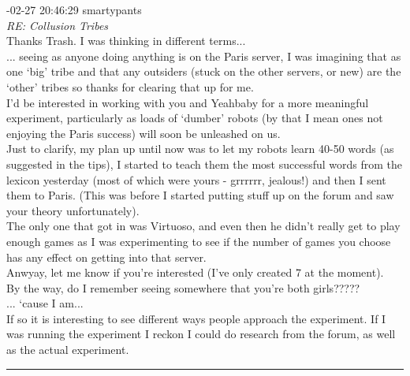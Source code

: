 \begin{mail}
{-02-27 20:46:29 smartypants}\\
{\itshape RE: Collusion Tribes}\\
Thanks Trash. I was thinking in different terms...\\
... seeing as anyone doing anything is on the Paris server, I was imagining that as one `big' tribe and that any outsiders (stuck on the other servers, or new) are the `other' tribes so thanks for clearing that up for me.\\
I'd be interested in working with you and Yeahbaby for a more meaningful experiment, particularly as loads of `dumber' robots (by that I mean ones not enjoying the Paris success) will soon be unleashed on us.\\
Just to clarify, my plan up until now was to let my robots learn 40-50 words (as suggested in the tips), I started to teach them the most successful words from the lexicon yesterday (most of which were yours - grrrrrr, jealous!) and then I sent them to Paris. (This was before I started putting stuff up on the forum and saw your theory unfortunately). \\
The only one that got in was Virtuoso, and even then he didn't really get to play enough games as I was experimenting to see if the number of games you choose has any effect on getting into that server.\\
Anwyay, let me know if you're interested (I've only created 7 at the moment).\\
By the way, do I remember seeing somewhere that you're both girls?????\\
... `cause I am...\\
If so it is interesting to see different ways people approach the experiment. If I was running the experiment I reckon I could do research from the forum, as well as the actual experiment.\\

\rule{0.8\textwidth}{.4pt}


\end{mail}
